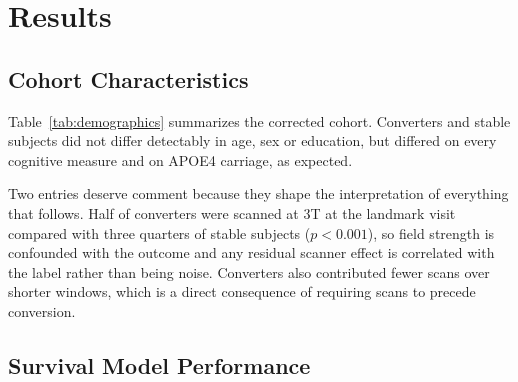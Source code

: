 \documentclass[blue]{ludusofficial}  %
\begin{document}
\section{Results}

\subsection{Cohort Characteristics}


Table~\ref{tab:demographics} summarizes the corrected cohort. Converters and stable subjects did not differ detectably in age, sex or education, but differed on every cognitive measure and on APOE4 carriage, as expected.

Two entries deserve comment because they shape the interpretation of everything that follows. Half of converters were scanned at 3T at the landmark visit compared with three quarters of stable subjects ($p<0.001$), so field strength is confounded with the outcome and any residual scanner effect is correlated with the label rather than being noise. Converters also contributed fewer scans over shorter windows, which is a direct consequence of requiring scans to precede conversion.

\subsection{Survival Model Performance}
\end{document}
